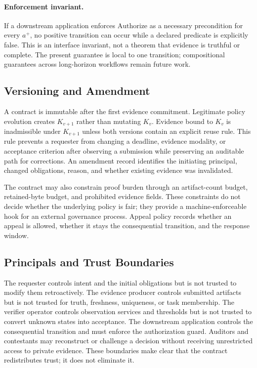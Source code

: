 \documentclass[sigconf,anonymous,review]{acmart}
\begin{document}
\paragraph{Enforcement invariant.} If a downstream application enforces $\mathrm{Authorize}$ as a necessary precondition for every $a^+$, no positive transition can occur while a declared predicate is explicitly false. This is an interface invariant, not a theorem that evidence is truthful or complete. The present guarantee is local to one transition; compositional guarantees across long-horizon workflows remain future work.

\subsection{Versioning and Amendment}
A contract is immutable after the first evidence commitment. Legitimate policy evolution creates $K_{v+1}$ rather than mutating $K_v$. Evidence bound to $K_v$ is inadmissible under $K_{v+1}$ unless both versions contain an explicit reuse rule. This rule prevents a requester from changing a deadline, evidence modality, or acceptance criterion after observing a submission while preserving an auditable path for corrections. An amendment record identifies the initiating principal, changed obligations, reason, and whether existing evidence was invalidated.

The contract may also constrain proof burden through an artifact-count budget, retained-byte budget, and prohibited evidence fields. These constraints do not decide whether the underlying policy is fair; they provide a machine-enforceable hook for an external governance process. Appeal policy records whether an appeal is allowed, whether it stays the consequential transition, and the response window.

\subsection{Principals and Trust Boundaries}
The requester controls intent and the initial obligations but is not trusted to modify them retroactively. The evidence producer controls submitted artifacts but is not trusted for truth, freshness, uniqueness, or task membership. The verifier operator controls observation services and thresholds but is not trusted to convert unknown states into acceptance. The downstream application controls the consequential transition and must enforce the authorization guard. Auditors and contestants may reconstruct or challenge a decision without receiving unrestricted access to private evidence. These boundaries make clear that the contract redistributes trust; it does not eliminate it.
\end{document}
